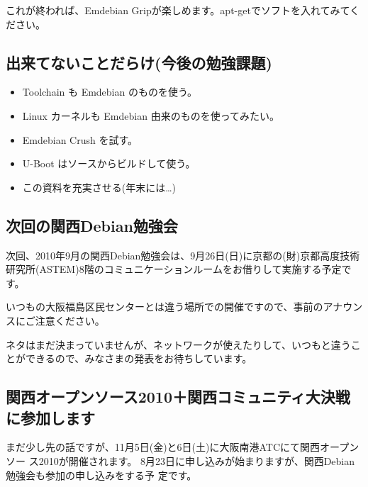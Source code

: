 \documentclass[mingoth,a4paper]{jsarticle}
\begin{document}
これが終われば、Emdebian Gripが楽しめます。apt-getでソフトを入れてみてく
ださい。

\subsection{出来てないことだらけ(今後の勉強課題)}
\begin{itemize}
 \item Toolchain も Emdebian のものを使う。
 \item Linux カーネルも Emdebian 由来のものを使ってみたい。
 \item Emdebian Crush を試す。
 \item U-Boot はソースからビルドして使う。
 \item この資料を充実させる(年末には…)
\end{itemize}


\subsection{次回の関西Debian勉強会}
次回、2010年9月の関西Debian勉強会は、9月26日(日)に京都の(財)京都高度技術
研究所(ASTEM)8階のコミュニケーションルームをお借りして実施する予定です。

いつもの大阪福島区民センターとは違う場所での開催ですので、事前のアナウン
スにご注意ください。

ネタはまだ決まっていませんが、ネットワークが使えたりして、いつもと違うこ
とができるので、みなさまの発表をお待ちしています。

\subsection{関西オープンソース2010＋関西コミュニティ大決戦に参加します}
まだ少し先の話ですが、11月5日(金)と6日(土)に大阪南港ATCにて関西オープンソー
ス2010が開催されます。
8月23日に申し込みが始まりますが、関西Debian勉強会も参加の申し込みをする予
定です。



\printindex
 \cleartooddpage
\end{document}

